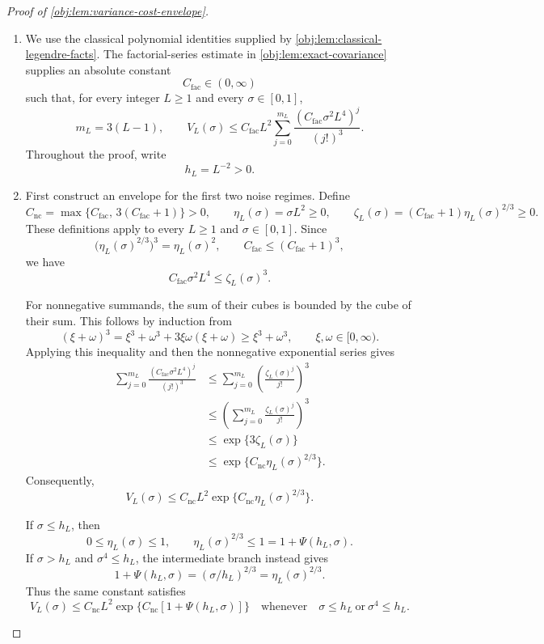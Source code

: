 \begin{proof}[Proof of \cref{obj:lem:variance-cost-envelope}]
\begin{enumerate}
\item We use the classical polynomial identities supplied by
\cref{obj:lem:classical-legendre-facts}. The factorial-series estimate in
\cref{obj:lem:exact-covariance} supplies an absolute constant
\[
C_{\mathrm{fac}}\in(0,\infty)
\]
such that, for every integer \(L\ge1\) and every \(\sigma\in[0,1]\),
\[
m_L=3(L-1),\qquad
V_L(\sigma)\le C_{\mathrm{fac}}L^2
\sum_{j=0}^{m_L}
\frac{(C_{\mathrm{fac}}\sigma^2L^4)^j}{(j!)^3}.
\]
Throughout the proof, write
\[
h_L=L^{-2}>0.
\]

\item First construct an envelope for the first two noise regimes. Define
\[
C_{\mathrm{nc}}
=\max\{C_{\mathrm{fac}},\,3(C_{\mathrm{fac}}+1)\}>0,
\qquad
\eta_L(\sigma)=\sigma L^2\ge0,
\qquad
\zeta_L(\sigma)=(C_{\mathrm{fac}}+1)\eta_L(\sigma)^{2/3}\ge0.
\]
These definitions apply to every \(L\ge1\) and \(\sigma\in[0,1]\). Since
\[
\bigl(\eta_L(\sigma)^{2/3}\bigr)^3=\eta_L(\sigma)^2,
\qquad
C_{\mathrm{fac}}\le(C_{\mathrm{fac}}+1)^3,
\]
we have
\[
C_{\mathrm{fac}}\sigma^2L^4
\le \zeta_L(\sigma)^3.
\]

For nonnegative summands, the sum of their cubes is bounded by the cube
of their sum. This follows by induction from
\[
(\xi+\omega)^3
=\xi^3+\omega^3+3\xi\omega(\xi+\omega)
\ge \xi^3+\omega^3,
\qquad \xi,\omega\in[0,\infty).
\]
Applying this inequality and then the nonnegative exponential series gives
\[
\begin{aligned}
\sum_{j=0}^{m_L}
\frac{(C_{\mathrm{fac}}\sigma^2L^4)^j}{(j!)^3}
&\le
\sum_{j=0}^{m_L}
\left(\frac{\zeta_L(\sigma)^j}{j!}\right)^3\\
&\le
\left(\sum_{j=0}^{m_L}\frac{\zeta_L(\sigma)^j}{j!}\right)^3\\
&\le \exp\{3\zeta_L(\sigma)\}\\
&\le \exp\{C_{\mathrm{nc}}\eta_L(\sigma)^{2/3}\}.
\end{aligned}
\]
Consequently,
\[
V_L(\sigma)
\le C_{\mathrm{nc}}L^2
\exp\{C_{\mathrm{nc}}\eta_L(\sigma)^{2/3}\}.
\]

If \(\sigma\le h_L\), then
\[
0\le\eta_L(\sigma)\le1,
\qquad
\eta_L(\sigma)^{2/3}\le1
=1+\Psi(h_L,\sigma).
\]
If \(\sigma>h_L\) and \(\sigma^4\le h_L\), the intermediate branch instead gives
\[
1+\Psi(h_L,\sigma)
=(\sigma/h_L)^{2/3}
=\eta_L(\sigma)^{2/3}.
\]
Thus the same constant satisfies
\[
V_L(\sigma)\le C_{\mathrm{nc}}L^2
\exp\{C_{\mathrm{nc}}[1+\Psi(h_L,\sigma)]\}
\quad\text{whenever}\quad
\sigma\le h_L\ \text{or}\ \sigma^4\le h_L.
\]


\end{enumerate}
\end{proof}
